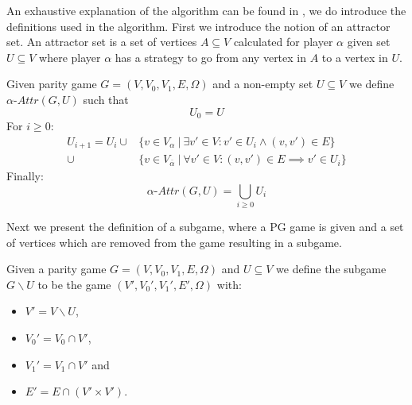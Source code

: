 An exhaustive explanation of the algorithm can be found in \cite{ZIELONKA1998135}, we do introduce the definitions used in the algorithm. First we introduce the notion of an attractor set. An attractor set is a set of vertices $A \subseteq V$ calculated for player $\alpha$ given set $U \subseteq V$ where player $\alpha$ has a strategy to go from any vertex in $A$ to a vertex in $U$.

\begin{definition}\cite{ZIELONKA1998135}
	\label{def_attr}Given parity game $G = (V,V_0,V_1,E,\Omega)$ and a non-empty set $U \subseteq V$ we define $\alpha\textit{-Attr}(G,U)$ such that
	\[U_0 = U \]
	For $i \geq 0$:
	\begin{align*}
	U_{i+1} = U_i\cup
	&\{v \in V_\alpha\ |\ \exists v' \in V : v' \in U_i \wedge (v,v') \in E \}\\
	\cup &\{v \in V_{\overline{\alpha}}\ |\ \forall v' \in V :(v,v') \in E \implies v' \in U_i \}
	\end{align*}
	Finally:
	\[\alpha\textit{-Attr}(G,U) = \bigcup_{i \geq 0} U_i \]
\end{definition}

Next we present the definition of a subgame, where a PG game is given and a set of vertices which are removed from the game resulting in a subgame.

\begin{definition}\cite{ZIELONKA1998135}
\label{def_org_subgame}
Given a parity game $G = (V,V_0,V_1, E,\Omega)$ and $U \subseteq V$ we define the subgame $G \backslash U$ to be the game $(V', V_0', V_1', E', \Omega)$ with:
\begin{itemize}
	\item $V' = V \backslash U$,
	\item $V_0' = V_0 \cap V'$,
	\item $V_1' = V_1 \cap V'$ and
	\item $E' = E \cap (V' \times V')$.
\end{itemize}
\end{definition}

